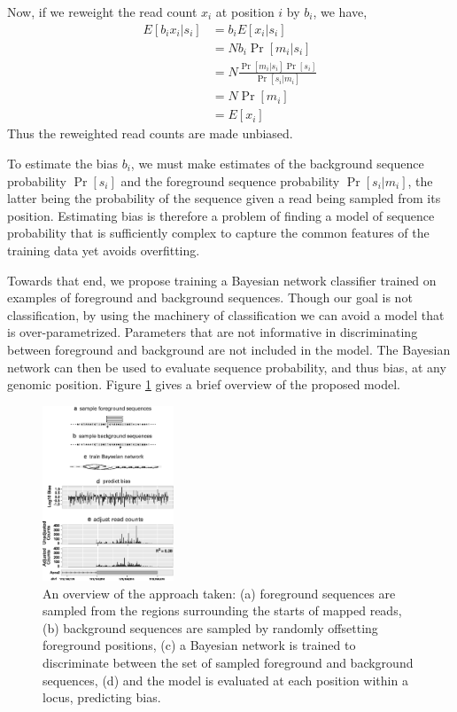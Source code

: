 \documentclass{bioinfo}
\begin{document}
Now, if we reweight the read count $x_i$ at position $i$ by $b_i$, we
have,
\begin{align*}
E[ b_i x_i | s_i ] &= b_i E[ x_i | s_i ] \\
&= N b_i \Pr[ m_i | s_i ] \\
&= N \frac{ \Pr[ m_i | s_i ] \Pr[ s_i ] }{ \Pr[ s_i | m_i ] } \\
&= N \Pr[ m_i ] \\
&= E[ x_i ]
\end{align*}
Thus the reweighted read counts are made unbiased.

To estimate the bias $b_i$, we must make estimates of the background sequence
probability $\Pr[s_i]$ and the foreground sequence probability $\Pr[ s_i | m_i
]$, the latter being the probability of the sequence given a read being sampled
from its position. Estimating bias is therefore a problem of finding a model of
sequence probability that is sufficiently complex to capture the common features
of the training data yet avoids overfitting.

Towards that end, we propose training a Bayesian network classifier trained on
examples of foreground and background sequences. Though our goal is not
classification, by using the machinery of classification we can avoid a model
that is over-parametrized. Parameters that are not informative in
discriminating between foreground and background are not included in the model.
The Bayesian network can then be used to evaluate sequence probability, and thus
bias, at any genomic position. Figure \ref{fig:overview} gives a brief overview
of the proposed model.

\begin{figure}
\centerline{\includegraphics[width=0.35\textwidth]{overview.eps}}
\caption{An overview of the approach taken: (a) foreground sequences are sampled
from the regions surrounding the starts of mapped reads, (b) background
sequences are sampled by randomly offsetting foreground positions, (c) a
Bayesian network is trained to discriminate between the set of
sampled foreground and background sequences, (d) and the model is evaluated
at each position within a locus, predicting bias.}
\label{fig:overview}
\end{figure}
\end{document}
